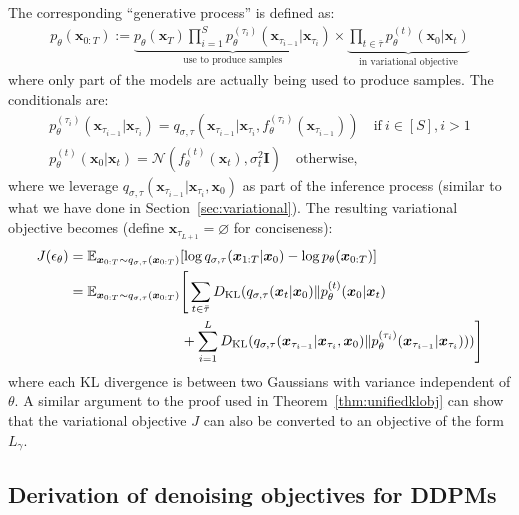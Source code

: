 The corresponding ``generative process'' is defined as:
\begin{align}
    p_\theta(\bm{x}_{0:T}) := \underbrace{p_\theta(\bm{x}_T) \prod_{i=1}^{S} p^{(\tau_i)}_\theta(\bm{x}_{\tau_{i-1}} | \bm{x}_{\tau_i})}_{\text{use to produce samples}} \times \underbrace{\prod_{t \in \bar{\tau}} p_\theta^{(t)}(\bm{x}_{0} | \bm{x}_t)}_{\text{in variational objective}} 
\end{align}
where only part of the models are actually being used to produce samples. The conditionals are:
\begin{gather}
    p_\theta^{(\tau_i)}(\bm{x}_{\tau_{i-1}} | \bm{x}_{\tau_i}) = q_{\sigma, \tau}(\bm{x}_{\tau_{i-1}} | \bm{x}_{\tau_i}, f_{\theta}^{(\tau_i)}(\bm{x}_{\tau_{i-1}})) \quad  \text{if} \ i \in [S], i > 1 \\
     p_\theta^{(t)}(\bm{x}_0 | \bm{x}_{t}) = \mathcal{N}(f_\theta^{(t)}(\bm{x}_t), \sigma_t^2 \bm{I})  \quad \text{otherwise,}
\end{gather}
where we leverage $q_{\sigma, \tau}(\bm{x}_{\tau_{i-1}} | \bm{x}_{\tau_{i}}, \bm{x}_0)$ as part of the inference process (similar to what we have done in Section~\ref{sec:variational}). The resulting variational objective becomes (define $\bm{x}_{\tau_{L+1}} = \varnothing$ for conciseness):
\begin{align}
   J(\epsilon_\theta) & = {\mathbb{E}}_{\bm{x}_{0:T} \sim q_{\sigma, \tau}(\bm{x}_{0:T})}[ \log q_{\sigma, \tau}(\bm{x}_{1:T} | \bm{x}_0) - \log p_\theta(\bm{x}_{0:T})] \\
   & ={\mathbb{E}}_{\bm{x}_{0:T} \sim q_{\sigma, \tau}(\bm{x}_{0:T})}\Bigg[ \sum_{t \in \bar{\tau}} D_{\mathrm{KL}}(q_{\sigma, \tau}(\bm{x}_{t} | \bm{x}_0) \Vert p_\theta^{(t)}(\bm{x}_0 | \bm{x}_{t}) \\
   & \qquad \qquad \qquad \qquad + \sum_{i=1}^{L} D_{\mathrm{KL}}(q_{\sigma, \tau}(\bm{x}_{\tau_{i-1}} | \bm{x}_{\tau_{i}}, \bm{x}_0) \Vert p_\theta^{(\tau_i)}(\bm{x}_{\tau_{i-1}} | \bm{x}_{\tau_i})) ) \Bigg] \nonumber
\end{align}
where each KL divergence is between two Gaussians with variance independent of $\theta$. A similar argument to the proof used in Theorem~\ref{thm:unifiedklobj} can show that the variational objective $J$ can also be converted to an objective of the form $L_\gamma$.




\subsection{Derivation of denoising objectives for DDPMs}
\label{app:ddpm}

